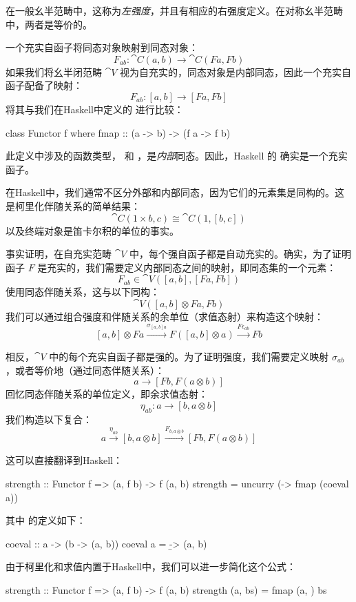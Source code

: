 \documentclass[DaoFP]{subfiles}
\begin{document}
在一般幺半范畴中，这称为\emph{左强度}，并且有相应的右强度定义。在对称幺半范畴中，两者是等价的。

一个充实自函子将同态对象映射到同态对象：
\[ F_{a b} \colon \cat C (a, b) \to \cat C (F a, F b) \]
如果我们将幺半闭范畴 $\cat V$ 视为自充实的，同态对象是内部同态，因此一个充实自函子配备了映射：
\[ F_{a b} \colon [a, b] \to [F a, F b] \]
将其与我们在Haskell中定义的  进行比较：
\begin{haskell}
class Functor f where
  fmap :: (a -> b) -> (f a -> f b)
\end{haskell}
此定义中涉及的函数类型， 和 ，是\emph{内部}同态。因此，Haskell 的  确实是一个充实函子。

在Haskell中，我们通常不区分外部和内部同态，因为它们的元素集是同构的。这是柯里化伴随关系的简单结果：
\[ \cat C(1 \times b, c) \cong \cat C(1, [b, c]) \]
以及终端对象是笛卡尔积的单位的事实。

事实证明，在自充实范畴 $\cat V$ 中，每个强自函子都是自动充实的。确实，为了证明函子 $F$ 是充实的，我们需要定义内部同态之间的映射，即同态集的一个元素：
\[ F_{a b} \in \cat V([a, b], [F a, F b]) \]
使用同态伴随关系，这与以下同构：
\[ \cat V([a, b] \otimes F a, F b) \]
我们可以通过组合强度和伴随关系的余单位（求值态射）来构造这个映射：
\[ [a, b] \otimes F a \xrightarrow{\sigma_{[a, b] a}} F ([a, b] \otimes a) \xrightarrow{F \epsilon_{a b}} F b \]

相反，$\cat V$ 中的每个充实自函子都是强的。为了证明强度，我们需要定义映射 $\sigma_{a b}$，或者等价地（通过同态伴随关系）：
\[ a \to [F b, F (a \otimes b)] \]
回忆同态伴随关系的单位定义，即余求值态射：
\[ \eta_{a b} \colon a \to [b, a \otimes b] \]
我们构造以下复合：
\[ a \xrightarrow{\eta_{a b}} [b, a \otimes b] \xrightarrow{F_{b, a \otimes b}} [F b, F (a \otimes b)] \]

这可以直接翻译到Haskell：
\begin{haskell}
strength :: Functor f => (a, f b) -> f (a, b)
strength = uncurry (\a -> fmap (coeval a))
\end{haskell}
其中  的定义如下：
\begin{haskell}
coeval :: a -> (b -> (a, b))
coeval a = \b -> (a, b)
\end{haskell}
由于柯里化和求值内置于Haskell中，我们可以进一步简化这个公式：
\begin{haskell}
strength :: Functor f => (a, f b) -> f (a, b)
strength (a, bs) = fmap (a, ) bs
\end{haskell}
\end{document}

